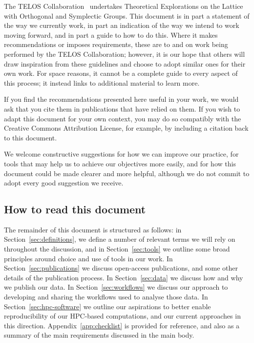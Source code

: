 \documentclass{article}
\begin{document}
The TELOS Collaboration~\cite{telos} undertakes
Theoretical Explorations on the Lattice with Orthogonal and Symplectic Groups.
This document is in part a statement of the way we currently work,
in part an indication of the way we intend to work moving forward,
and in part a guide to how to do this.
Where it makes recommendations or imposes requirements,
these are to and on work being performed by the TELOS Collaboration;
however,
it is our hope that others will draw inspiration from these guidelines
and choose to adopt similar ones for their own work.
For space reasons,
it cannot be a complete guide to every aspect of this process;
it instead links to additional material to learn more.

If you find the recommendations presented here useful in your work,
we would ask that you cite them in publications that have relied on them.
If you wish to adapt this document for your own context,
you may do so compatibly with the Creative Commons Attribution License,
for example,
by including a citation back to this document.

We welcome constructive suggestions for how we can improve our practice,
for tools that may help us to achieve our objectives more easily,
and for how this document could be made clearer and more helpful,
although we do not commit to adopt every good suggestion we receive.

\tableofcontents

\subsection{How to read this document}

The remainder of this document is structured as follows:
in Section~\ref{sec:definitions},
we define a number of relevant terms we will rely on throughout the discussion,
and in Section~\ref{sec:tools} we outline
some broad principles around choice and use of tools in our work.
In Section~\ref{sec:publications} we discuss open-access publications,
and some other details of the publication process.
In Section~\ref{sec:data} we discuss how and why we publish our data.
In Section~\ref{sec:workflows} we discuss our approach to developing and sharing
the workflows used to analyse those data.
In Section~\ref{sec:hpc-software} we outline our aspirations to
better enable reproducibility of our HPC-based computations,
and our current approaches in this direction.
Appendix~\ref{app:checklist} is provided for reference,
and also as a summary of the main requirements discussed in the main body.
\end{document}
